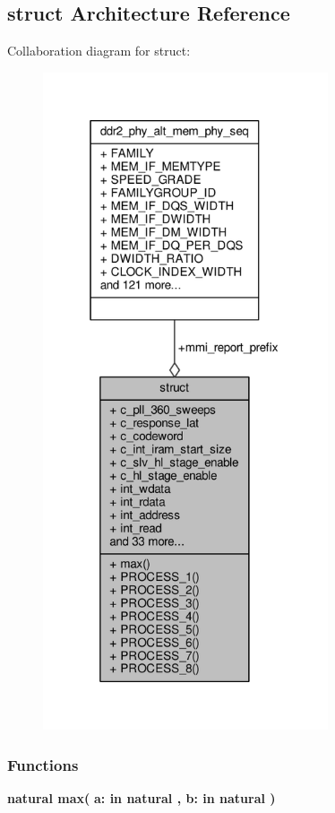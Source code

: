 \subsection{struct Architecture Reference}
\label{classddr2__phy__alt__mem__phy__mmi_1_1struct}


Collaboration diagram for struct\+:\nopagebreak
\begin{figure}[H]
\begin{center}
\leavevmode
\includegraphics[height=550pt]{df/dc0/classddr2__phy__alt__mem__phy__mmi_1_1struct__coll__graph}
\end{center}
\end{figure}
\subsubsection*{Functions}
 \begin{DoxyCompactItemize}
\item 
{\bfseries {\bfseries \textcolor{comment}{natural}\textcolor{vhdlchar}{ }}} {\bf max}{\bfseries  ( }{\bfseries \textcolor{vhdlchar}{a\+: }\textcolor{stringliteral}{in }{\bfseries \textcolor{comment}{natural}\textcolor{vhdlchar}{ }}}{\bfseries  , \textcolor{vhdlchar}{b\+: }\textcolor{stringliteral}{in }{\bfseries \textcolor{comment}{natural}\textcolor{vhdlchar}{ }}}{\bfseries  )} 
\end{DoxyCompactItemize}
